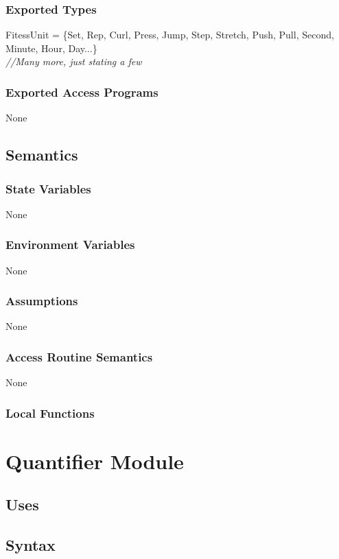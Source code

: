 \documentclass[12pt, titlepage]{article}
\begin{document}
\subsubsection{Exported Types}
FitessUnit = \{Set, Rep, Curl, Press, Jump, Step, Stretch, Push, Pull, Second, Minute, Hour, Day...\} 
\\
\textit{//Many more, just stating a few}
\subsubsection{Exported Access Programs}

None

\subsection{Semantics}
\subsubsection{State Variables}
None

\subsubsection{Environment Variables}
None

\subsubsection{Assumptions}
None

\subsubsection{Access Routine Semantics}

None

\subsubsection{Local Functions}


\newpage

\section{Quantifier Module}

\subsection{Uses}

\subsection{Syntax}
\end{document}
